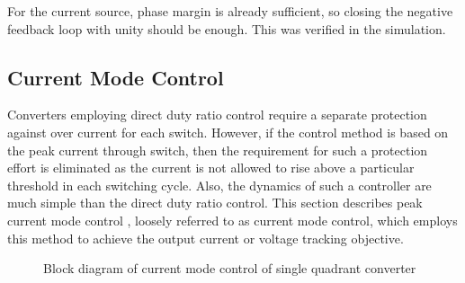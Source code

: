 \documentclass[a4paper]{IEEEtran}
\begin{document}
	For the current source, phase margin is already sufficient, so closing the negative feedback loop with unity should be enough. This was verified in the simulation.

\subsection{Current Mode Control}
	Converters employing direct duty ratio control require a separate protection against over current for each switch. However, if the control method is based on the peak current through switch, then the requirement for such a protection effort is eliminated as the current is not allowed to rise above a particular threshold in each switching cycle. Also, the dynamics of such a controller are much simple than the direct duty ratio control. This section describes peak current mode control \cite{book:941109}, loosely referred to as current mode control, which employs this method to achieve the output current or voltage tracking objective.

	\begin{figure}
		\centering
		
		\caption{Block diagram of current mode control of single quadrant converter}
		\label{fig:16}
	\end{figure}
\end{document}
